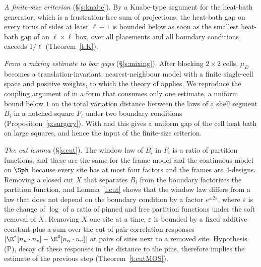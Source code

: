 \emph{A finite-size criterion} (\S\ref{s:knabe}). By a Knabe-type argument for the heat-bath generator, which is a frustration-free sum of projections, the heat-bath gap on every torus of sides at least $\ell + 1$ is bounded below as soon as the smallest heat-bath gap of an $\ell \times \ell$ box, over all placements and all boundary conditions, exceeds $1/\ell$ (Theorem~\ref{t:K}).

\emph{From a mixing estimate to box gaps} (\S\ref{s:mixing}). After blocking $2 \times 2$ cells, $\mu_D$ becomes a translation-invariant, nearest-neighbour model with a finite single-cell space and positive weights, to which the theory of \cite{MOS94, MO94} applies. We reproduce the coupling argument of \cite[Proposition~2.1]{MOS94} in a form that consumes only one estimate, a uniform bound below $1$ on the total variation distance between the laws of a shell segment $B_i$ in a notched square $F_i$ under two boundary conditions (Proposition~\ref{p:surgery}). With \cite[Theorem~2.1]{MOS94} and \cite[Theorem~4.1]{MO94} this gives a uniform gap of the cell heat bath on large squares, and hence the input of the finite-size criterion.

\emph{The cut lemma} (\S\ref{s:cut}). The window law of $B_i$ in $F_i$ is a ratio of partition functions, and these are the same for the frame model and the continuous model on $\Sph$ because every site has at most four factors and the frames are $4$-designs. Removing a closed cut $X$ that separates $B_i$ from the boundary factorizes the partition function, and Lemma~\ref{l:cut} shows that the window law differs from a law that does not depend on the boundary condition by a factor $e^{\pm 2 \varepsilon}$, where $\varepsilon$ is the change of $\log$ of a ratio of pinned and free partition functions under the soft removal of $X$. Removing $X$ one site at a time, $\varepsilon$ is bounded by a fixed additive constant plus a sum over the cut of pair-correlation responses $|\E^\tau[n_u \cdot n_v] - \E^0[n_u \cdot n_v]|$ at pairs of sites next to a removed site. Hypothesis (P), decay of these responses in the distance to the pins, therefore implies the estimate of the previous step (Theorem~\ref{t:cutMOS}).

